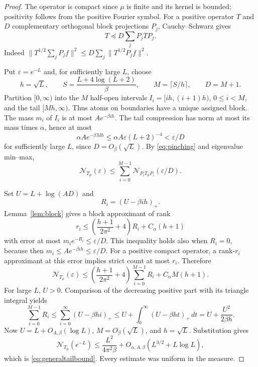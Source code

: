 \documentclass[11pt]{article}
\newcommand{\N}{\mathcal N}
\begin{document}
\begin{proof}
The operator is compact since $\mu$ is finite and its kernel is
bounded; positivity follows from the positive Fourier symbol.
For a positive operator $T$ and $D$ complementary orthogonal block
projections $P_j$, Cauchy--Schwarz gives
\begin{equation}\label{eq:pinching}
 T\preceq D\sum_jP_jTP_j.
\end{equation}
Indeed $\|T^{1/2}\sum_jP_jf\|^2
\le D\sum_j\|T^{1/2}P_jf\|^2$.

Put $\varepsilon=e^{-L}$ and, for sufficiently large $L$, choose
\[
 h=\sqrt L,\qquad
 S=\frac{L+4\log(L+2)}\beta,\qquad
 M=\lceil S/h\rceil,\qquad D=M+1.
\]
Partition $[0,\infty)$ into the $M$ half-open intervals
$I_i=[ih,(i+1)h)$, $0\le i<M$, and the tail $[Mh,\infty)$.
Thus atoms on boundaries have a unique assigned block.
The mass $m_i$ of $I_i$ is at most $A e^{-\beta ih}$.
The tail compression has norm at most its mass times $\alpha$, hence
at most
\[
 \alpha A e^{-\beta Mh}
 \le \alpha A\varepsilon(L+2)^{-4}
 <\varepsilon/D
\]
for sufficiently large $L$, since $D=O_\beta(\sqrt L)$.
By \eqref{eq:pinching} and eigenvalue min--max,
\begin{equation}\label{eq:countblocks}
 \N_{T_\mu}(\varepsilon)
 \le\sum_{i=0}^{M-1}\N_{P_iT_\mu P_i}(\varepsilon/D).
\end{equation}

Set $U=L+\log(AD)$ and
\[
                         R_i=(U-\beta ih)_+.
\]
Lemma~\ref{lem:block} gives a block approximant of rank
\[
 r_i\le\left(\frac{h+1}{2\pi^2}+4\right)R_i+C_\alpha(h+1)
\]
with error at most $m_i e^{-R_i}\le\varepsilon/D$.
This inequality holds also when $R_i=0$, because then
$m_i\le A e^{-\beta ih}\le\varepsilon/D$.
For a positive compact operator, a rank-$r_i$ approximant at this
error implies strict count at most $r_i$. Therefore
\[
 \N_{T_\mu}(\varepsilon)
 \le\left(\frac{h+1}{2\pi^2}+4\right)\sum_{i=0}^{M-1}R_i
                                      +C_\alpha M(h+1).
\]
For large $L$, $U>0$. Comparison of the decreasing positive part
with its triangle integral yields
\[
 \sum_{i=0}^{M-1}R_i
 \le\sum_{i=0}^\infty(U-\beta hi)_+
 \le U+\int_0^\infty(U-\beta ht)_+\,dt
 =U+\frac{U^2}{2\beta h}.
\]
Now $U=L+O_{A,\beta}(\log L)$, $M=O_\beta(\sqrt L)$, and
$h=\sqrt L$. Substitution gives
\[
 \N_{T_\mu}(e^{-L})
 \le\frac{L^2}{4\pi^2\beta}
       +O_{\alpha,A,\beta}(L^{3/2}+L\log L),
\]
which is \eqref{eq:generaltailbound}.
Every estimate was uniform in the measure.
\end{proof}
\end{document}
